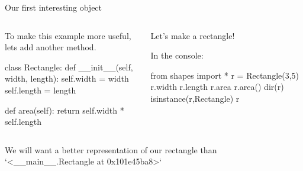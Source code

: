 \documentclass[aspectratio=169] {beamer}
\begin{document}
\begin{frame}[fragile,t]{Our first interesting object}


  \begin{columns}
    \begin{column}[t]{.63\textwidth}
      To make this example more useful,\\lets add another method. 
 
      \begin{pythoncode}
        class Rectangle:
            def __init__(self, width, length):
                self.width = width
                self.length = length
    
            def area(self):
                return self.width * self.length
      \end{pythoncode}
      \pause
    \end{column}
    \begin{column}[t]{.36\textwidth}
      Let's make a rectangle!  

      In the console:
      \begin{pythoncode}
        from shapes import *
        r = Rectangle(3,5)
        r.width
        r.length
        r.area
        r.area()
        dir(r)
        isinstance(r,Rectangle)
        r
      \end{pythoncode}
    \end{column}
  \end{columns}

  \bigskip \pause
  
  We will want a better representation of our rectangle than \inlineverb`<__main__.Rectangle at 0x101e45ba8>`

\end{frame}
\end{document}
